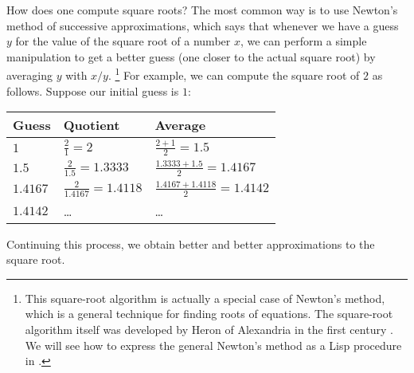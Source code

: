 How does one compute square roots?
The most common way is to use Newton’s method of successive approximations, which says that whenever we have a guess \( y \) for the value of the square root of a number \( x \), we can perform a simple manipulation to get a better guess (one closer to the actual square
root) by averaging \( y \) with \( x / y \).%
\footnote{
	This square-root algorithm is actually a special case of Newton’s method, which is a general technique for finding roots of equations.
	The square-root algorithm itself was developed by Heron of Alexandria in the first century .
	We will see how to express the general Newton’s method as a Lisp procedure in .
}
For example, we can compute the square root of \( 2 \) as follows.
Suppose our initial guess is \( 1 \):
\begin{center}
	\begin{tabular}{l>{\quad}l>{\quad}l}
		\toprule
		Guess        & Quotient                        & Average                                  \\
		\midrule
		\( 1 \)      & \( \frac{2}{1} = 2 \)           & \( \frac{2 + 1}{2} = 1.5 \)              \\[1em]
		\( 1.5 \)    & \( \frac{2}{1.5} = 1.3333 \)    & \( \frac{1.3333 + 1.5}{2} = 1.4167 \)    \\[1em]
		\( 1.4167 \) & \( \frac{2}{1.4167} = 1.4118 \) & \( \frac{1.4167 + 1.4118}{2} = 1.4142 \) \\[1em]
		\( 1.4142 \) & …                           & …                                            \\
		\bottomrule
	\end{tabular}
\end{center}
Continuing this process, we obtain better and better approximations to the square root.


